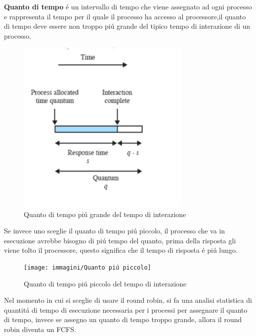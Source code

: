 \documentclass[11pt]{article}
\begin{document}
    \textbf{Quanto di tempo} é un intervallo di tempo che viene assegnato ad ogni processo e rappresenta il tempo per il quale il processo ha accesso
    al processore,il quanto di tempo deve essere non troppo piú grande del tipico tempo di interazione di un processo.
    \begin{figure}[H]
        \centering
        \includegraphics[width=0.75\textwidth]{immagini/Quanto di tempo Giusto}
        \caption{Quanto di tempo piú grande del tempo di interazione}
    \end{figure}
    Se invece uno sceglie il quanto di tempo piú piccolo, il processo che va in esecuzione avrebbe bisogno di piú tempo del quanto,
    prima della risposta gli viene tolto il processore, questo significa che il tempo di risposta é piú lungo.
    \begin{figure}[H]
        \centering
        \texttt{[image: immagini/Quanto piú piccolo]}
        \caption{Quanto di tempo piú piccolo del tempo di interazione}
    \end{figure}
    Nel momento in cui si sceglie di usare il round robin, si fa una analisi statistica di quantitá di tempo di esecuzione
    necessaria per i processi per assegnare il quanto di tempo, invece se assegno un quanto di tempo troppo grande, allora
    il round robin diventa un FCFS.
\end{document}
